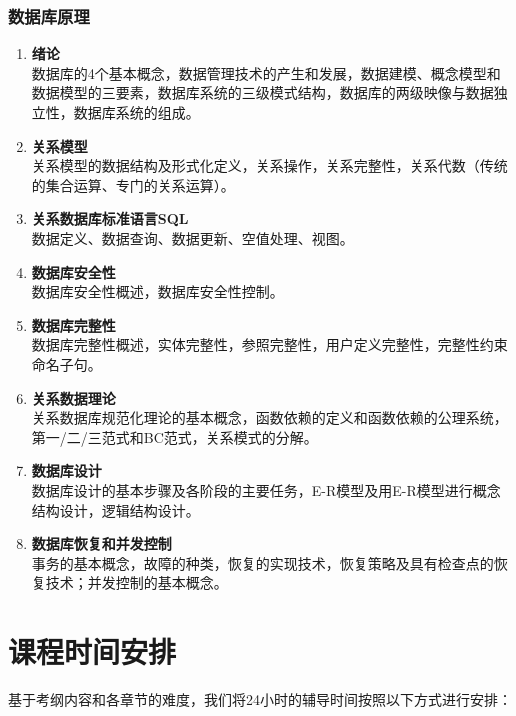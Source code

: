 \documentclass{../note}
\begin{document}
\subsubsection{数据库原理}
\begin{enumerate}
  \item \textbf{绪论}\\
    数据库的4个基本概念，数据管理技术的产生和发展，数据建模、概念模型和数据模型的三要素，数据库系统的三级模式结构，数据库的两级映像与数据独立性，数据库系统的组成。

  \item \textbf{关系模型}\\
    关系模型的数据结构及形式化定义，关系操作，关系完整性，关系代数（传统的集合运算、专门的关系运算）。

  \item \textbf{关系数据库标准语言SQL}\\
    数据定义、数据查询、数据更新、空值处理、视图。

  \item \textbf{数据库安全性}\\
    数据库安全性概述，数据库安全性控制。

  \item \textbf{数据库完整性}\\
    数据库完整性概述，实体完整性，参照完整性，用户定义完整性，完整性约束命名子句。

  \item \textbf{关系数据理论}\\
    关系数据库规范化理论的基本概念，函数依赖的定义和函数依赖的公理系统，第一/二/三范式和BC范式，关系模式的分解。

  \item \textbf{数据库设计}\\
    数据库设计的基本步骤及各阶段的主要任务，E-R模型及用E-R模型进行概念结构设计，逻辑结构设计。

  \item \textbf{数据库恢复和并发控制}\\
    事务的基本概念，故障的种类，恢复的实现技术，恢复策略及具有检查点的恢复技术；并发控制的基本概念。
\end{enumerate}

\section{课程时间安排}

基于考纲内容和各章节的难度，我们将24小时的辅导时间按照以下方式进行安排：
\end{document}
